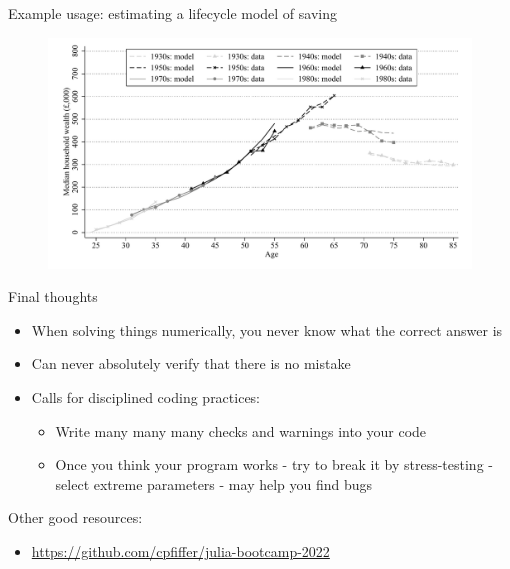 \documentclass[aspectratio=169]{beamer}
\begin{document}
\begin{frame}{Example usage: estimating a lifecycle model of saving}

\begin{figure}
	\includegraphics[height=0.8\textheight]{figures/Model_fit_all_gens.pdf}
\end{figure}

\end{frame}


\begin{frame}{Final thoughts}
\begin{itemize}
\item When solving things numerically, you never know what the correct answer is
\item Can never absolutely verify that there is no mistake
\item Calls for disciplined coding practices:
\begin{itemize}
\item Write many many many checks and warnings into your code
\item Once you think your program works - try to break it by stress-testing - select extreme parameters - may help you find bugs
\end{itemize}
\end{itemize}

\vspace{0.5cm}
Other good resources:
\begin{itemize}
	\item \url{https://github.com/cpfiffer/julia-bootcamp-2022}
\end{itemize}

\end{frame}
\end{document}

